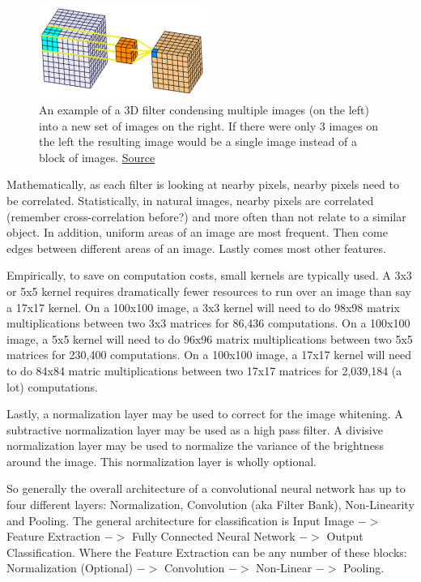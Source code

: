 \begin{figure}[ht]
  \centering
      \includegraphics[width=0.5\textwidth]{figs/3DConv.png}
          \caption{
            An example of a 3D filter condensing multiple images (on the left) into a new set of images on the right.
            If there were only 3 images on the left the resulting image would be a single image instead of a block of images.
            \href{https://www.kaggle.com/shivamb/3d-convolutions-understanding-use-case}{Source}
          }
\end{figure}

Mathematically, as each filter is looking at nearby pixels, nearby pixels need to be correlated. Statistically, in natural images, nearby pixels are correlated (remember cross-correlation before?) and more often than not relate to a similar object. In addition, uniform areas of an image are most frequent. Then come edges between different areas of an image.
Lastly comes most other features.

Empirically, to save on computation costs, small kernels are typically used. A 3x3 or 5x5 kernel requires dramatically fewer resources to run over an image than say a 17x17 kernel. On a 100x100 image, a 3x3 kernel will need to do 98x98 matrix multiplications between two 3x3 matrices for 86,436 computations. On a 100x100 image, a 5x5 kernel will need to do 96x96 matrix multiplications between two 5x5 matrices for 230,400 computations. On a 100x100 image, a 17x17 kernel will need to do 84x84 matric multiplications between two 17x17 matrices for 2,039,184 (a lot) computations.

Lastly, a normalization layer may be used to correct for the image whitening. A subtractive normalization layer may be used as a high pass filter. A divisive normalization layer may be used to normalize the variance of the brightness around the image. This normalization layer is wholly optional.

So generally the overall architecture of a convolutional neural network has up to four different layers: Normalization, Convolution (aka Filter Bank), Non-Linearity and Pooling. The general architecture for classification is Input Image $->$ Feature Extraction $->$ Fully Connected Neural Network $->$ Output Classification. Where the Feature Extraction can be any number of these blocks: Normalization (Optional) $->$ Convolution $->$ Non-Linear $->$ Pooling.

